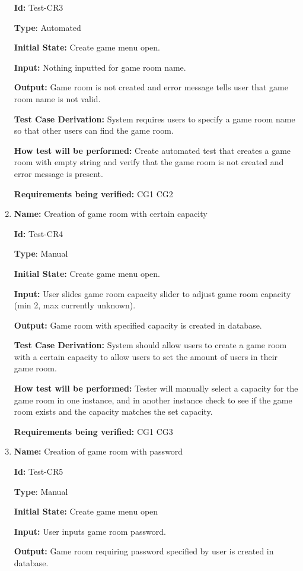 \documentclass[12pt, titlepage]{article}
\begin{document}
\begin{enumerate}
\textbf{Id:} Test-CR3

\textbf{Type}: Automated

\textbf{Initial State:} Create game menu open.

\textbf{Input:} Nothing inputted for game room name.

\textbf{Output:} Game room is not created and error message tells user that game room name is not valid.

\textbf{Test Case Derivation:} System requires users to specify a game room name so that other users can find the game room.

\textbf{How test will be performed:} Create automated test that creates a game room with empty string and verify that the game room is not created and error message is present.

\textbf{Requirements being verified:} CG1 CG2

\item{\textbf{Name:} Creation of game room with certain capacity}

\textbf{Id:} Test-CR4

\textbf{Type}: Manual

\textbf{Initial State:} Create game menu open.

\textbf{Input:} User slides game room capacity slider to adjust game room capacity (min 2, max currently unknown).

\textbf{Output:} Game room with specified capacity is created in database.

\textbf{Test Case Derivation:} System should allow users to create a game room with a certain capacity to allow users to set the amount of users in their game room.

\textbf{How test will be performed:} Tester will manually select a capacity for the game room in one instance, and in another instance check to see if the game room exists and the capacity matches the set capacity.

\textbf{Requirements being verified: }CG1 CG3

\item{\textbf{Name:} Creation of game room with password}

\textbf{Id:} Test-CR5

\textbf{Type}: Manual

\textbf{Initial State:} Create game menu open

\textbf{Input:} User inputs game room password.

\textbf{Output:} Game room requiring password specified by user is created in database.


\end{enumerate}
\end{document}

